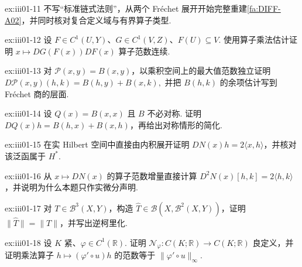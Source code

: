 \begin{FAExercise}{ex:iii01-11}
不写“标准链式法则”，从两个 Fréchet 展开开始完整重建\autoref{fa:DIFF-A02}，并同时核对复合定义域与有界算子类型.
\end{FAExercise}

\begin{FAExercise}[\(\displaystyle C^1\) 复合]{ex:iii01-12}
设 \(\displaystyle F\in C^1(U,Y)\)、\(\displaystyle G\in C^1(V,Z)\)、\(\displaystyle F(U)\subseteq V\). 使用算子乘法估计证明 \(\displaystyle x\mapsto DG(F(x))DF(x)\) 算子范数连续.
\end{FAExercise}

\begin{FAExercise}[有界双线性微分]{ex:iii01-13}
对 \(\displaystyle\mathcal P(x,y)=B(x,y)\)，以乘积空间上的最大值范数独立证明
\(\displaystyle D\mathcal P(x,y)(h,k)=B(h,y)+B(x,k),\)
并把 \(\displaystyle B(h,k)\) 的余项估计写到 Fréchet 商的层面.
\end{FAExercise}

\begin{FAExercise}[二次映射微分]{ex:iii01-14}
设 \(\displaystyle Q(x)=B(x,x)\) 且 \(\displaystyle B\) 不必对称. 证明 \(\displaystyle DQ(x)h=B(h,x)+B(x,h)\)，再给出对称情形的简化.
\end{FAExercise}

\begin{FAExercise}[范数平方一阶导数]{ex:iii01-15}
在实 Hilbert 空间中直接由内积展开证明 \(\displaystyle DN(x)h=2\langle x,h\rangle\)，并核对该泛函属于 \(\displaystyle H^*\).
\end{FAExercise}

\begin{FAExercise}[范数平方二阶导数]{ex:iii01-16}
从 \(\displaystyle x\mapsto DN(x)\) 的算子范数增量直接计算 \(\displaystyle D^2N(x)[h,k]=2\langle h,k\rangle\)，并说明为什么本题只作实微分声明.
\end{FAExercise}

\begin{FAExercise}[高阶微分的柯里化]{ex:iii01-17}
对 \(\displaystyle T\in\mathcal B^3(X,Y)\)，构造 \(\displaystyle\widehat T\in\mathcal B(X,\mathcal B^2(X,Y))\)，证明 \(\displaystyle\|\widehat T\|=\|T\|\)，并写出逆柯里化.
\end{FAExercise}

\begin{FAExercise}[Nemytskii的良定义与乘子]{ex:iii01-18}
设 \(\displaystyle K\) 紧、\(\displaystyle\varphi\in C^1(\mathbb R)\). 证明 \(\displaystyle\mathcal N_{\varphi}:C(K;\mathbb R)\to C(K;\mathbb R)\) 良定义，并证明乘法算子 \(\displaystyle h\mapsto(\varphi'\circ u)h\) 的范数等于 \(\displaystyle\|\varphi'\circ u\|_{\infty}\).
\end{FAExercise}

